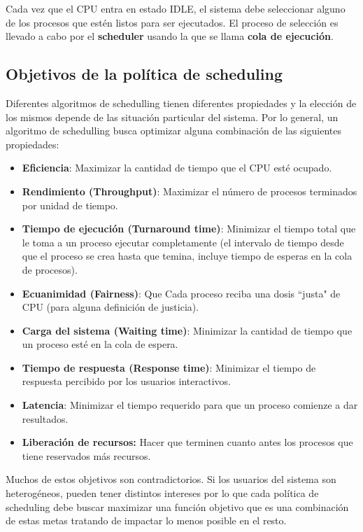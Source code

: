 	Cada vez que el CPU entra en estado IDLE, el sistema debe seleccionar alguno de los procesos que estén listos para ser ejecutados. El proceso de selección es llevado a cabo por el \textbf{scheduler} usando la que se llama \textbf{cola de ejecución}.
	
	\subsection{Objetivos de la política de scheduling}
	Diferentes algoritmos de schedulling tienen diferentes propiedades y la elección de los mismos depende de las situación particular del sistema. Por lo general, un algoritmo de schedulling busca optimizar alguna combinación de las siguientes propiedades:
	
	\begin{itemize}
		\item \textbf{Eficiencia}: Maximizar la cantidad de tiempo que el CPU esté ocupado.
		\item \textbf{Rendimiento (Throughput)}: Maximizar el número de procesos terminados por unidad de tiempo.
		\item \textbf{Tiempo de ejecución (Turnaround time)}: Minimizar el tiempo total que le toma a un proceso ejecutar completamente (el intervalo de tiempo desde que el proceso se crea hasta que temina, incluye tiempo de esperas en la cola de procesos).
		\item \textbf{Ecuanimidad (Fairness)}: Que Cada proceso reciba una dosis ``justa" de CPU (para alguna definición de justicia).
		\item \textbf{Carga del sistema (Waiting time)}: Minimizar la cantidad de tiempo que un proceso esté en la cola de espera.
		\item \textbf{Tiempo de respuesta (Response time)}: Minimizar el tiempo de respuesta percibido por los usuarios interactivos.
		\item \textbf{Latencia}: Minimizar el tiempo requerido para que un proceso comienze a dar resultados.
		
		\item \textbf{Liberación de recursos:} Hacer que terminen cuanto antes los procesos que tiene reservados más recursos.
	\end{itemize}
	Muchos de estos objetivos son contradictorios. Si los usuarios del sistema son heterogéneos, pueden tener distintos intereses por lo que cada política de scheduling debe buscar maximizar una función objetivo que es una combinación de estas metas tratando de impactar lo menos posible en el resto.
	
